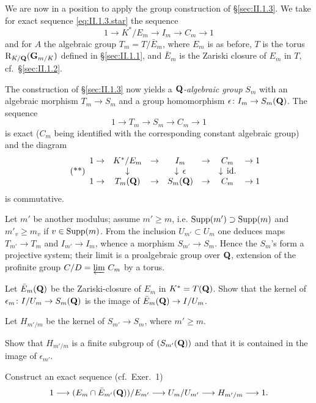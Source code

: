 
We are now in a position to apply the group construction of
\S\ref{sec:II.1.3}.  We take for exact sequence
\eqref{eq:II.1.3.star} the sequence
\[
1 \longrightarrow K^*/E_m \longrightarrow I_m \longrightarrow C_m
\longrightarrow 1
\]
and for $A$ the algebraic group $T_m = T/\bar{E}_m$, where $E_m$ is as
before, $T$ is the torus $\mathrm{R}_{K/\mathbf{Q}}(\mathbf{G}_{m/K})$ defined in
\S\ref{sec:II.1.1}, and $\bar{E}_m$ is the Zariski closure of $E_m$ in
$T$, cf.~\S\ref{sec:II.1.2}.

The construction of \S\ref{sec:II.1.3} now yields a
\emph{$\mathbf{Q}$-algebraic group} $S_m$ with an algebraic morphism
$T_m \to S_m$ and a group homomorphism $\epsilon\colon I_m \to S_m(\mathbf{Q})$.
The sequence
\[
1 \longrightarrow T_m \longrightarrow S_m \longrightarrow C_m
\longrightarrow 1
\]
is exact ($C_m$ being identified with the corresponding constant
algebraic group) and the diagram
\begin{equation}
\tag{**}\label{eq:II.2.2.starstar}
\begin{array}{ccccccc}
1 \to & K^*/E_m & \to & I_m & \to & C_m & \to 1\\
      & \downarrow & & \downarrow\, \epsilon & & \downarrow\, \mathrm{id.} & \\
1 \to & T_m(\mathbf{Q}) & \to & S_m(\mathbf{Q}) & \to & C_m & \to 1
\end{array}
\end{equation}
is commutative.


Let $m'$ be another modulus; assume $m' \geq m$, i.e.
$\mathrm{Supp}(m') \supset \mathrm{Supp}(m)$ and $m'_v \geq m_v$ if $v \in \mathrm{Supp}(m)$.
From the inclusion $U_{m'} \subset U_m$ one deduces maps
$T_{m'} \to T_m$ and $I_{m'} \to I_m$, whence a morphism
$S_{m'} \to S_m$.  Hence the $S_m$'s form a projective system; their
limit is a proalgebraic group over $\mathbf{Q}$, extension of the profinite group
$C/D = \varprojlim\, C_m$ by a torus.

\begin{exercises}
\begin{nlist}
\item Let $\bar{E}_m(\mathbf{Q})$ be the Zariski-closure of $E_m$ in
$K^* = T(\mathbf{Q})$.  Show that the kernel of
$\epsilon_m\colon I/U_m \to S_m(\mathbf{Q})$ is the image of
$\bar{E}_m(\mathbf{Q}) \to I/U_m$.

\item Let $H_{m'/m}$ be the kernel of $S_{m'} \to S_m$, where
$m' \geq m$.
\begin{alist}[label=\alph*)]
\item Show that $H_{m'/m}$ is a finite subgroup of $(S_{m'}(\mathbf{Q}))$ and
that it is contained in the image of $\epsilon_{m'}$.
\item Construct an exact sequence (cf.~Exer.~1)
\[
1 \longrightarrow (E_m \cap \bar{E}_{m'}(\mathbf{Q}))/E_{m'}
\longrightarrow U_m/U_{m'} \longrightarrow H_{m'/m} \longrightarrow 1.
\]
\end{alist}
\end{nlist}
\end{exercises}

